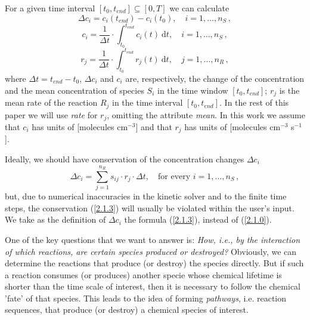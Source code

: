 For a given time interval $[t_0,t_{end}]\subseteq[0,T]$  we can calculate       
\begin{equation}
\Delta c_i = c_i(t_{end} )- c_i(t_0), \quad i = 1,\ldots, n_S\,,
\label{2.1.0}
\end{equation}   
\begin{equation}
c_i = \frac{1}{\Delta t}\cdot \int_{t_0}^{t_{end}} c_i(t)\ \textrm{d}t, \quad i = 1,\ldots, n_S\,,
\label{2.1.1}
\end{equation} 
\begin{equation}
r_j = \frac{1}{\Delta t}\cdot \int_{t_0}^{t_{end}} r_j(t)\ \textrm{d}t, \quad j = 1,\ldots, n_R\,,
\label{2.1.2}
\end{equation}   
where $\Delta t = t_{end} - t_0$, $\Delta c_i$ and $c_i$ are, respectively, the change of the concentration and the mean concentration of species $S_i$ in the time window $[t_0,t_{end}]$; $r_j$ is the mean rate of the reaction $R_j$ in the time interval $[t_0,t_{end}]$. In the rest of this paper we will use \textit{rate} for $r_j$, omitting the attribute \textit{mean}. In this work we assume that $c_i$ has units of [molecules cm$^{-3}$] and that $r_j$ has units of [molecules cm$^{-3}$ s$^{-1}$].

Ideally, we should have conservation of the concentration changes $\Delta c_i$
\begin{equation}
\Delta c_i=\sum_{j = 1}^{n_R}s_{ij}\cdot r_j\cdot \Delta t, \quad\textrm{for every }i = 1,\ldots, n_S\,,
\label{2.1.3}
\end{equation}   
but, due to numerical inaccuracies in the kinetic solver and to the finite time steps, the conservation (\ref{2.1.3}) will usually be violated within the user's input. We take as the definition of $\Delta c_i$ the formula (\ref{2.1.3}), instead of (\ref{2.1.0}). 

One of the key questions that we want to answer is: \textit{How, i.e., by the interaction of which reactions, are certain species produced or destroyed?} Obviously, we can determine the reactions that produce (or destroy) the species directly. But if such a reaction consumes (or produces) another specie whose chemical lifetime is shorter than the time scale of interest, then it is necessary to follow the chemical 'fate' of that species. This leads to the idea of forming \textit{pathways}, i.e. reaction sequences, that produce (or destroy) a chemical species of interest. 

